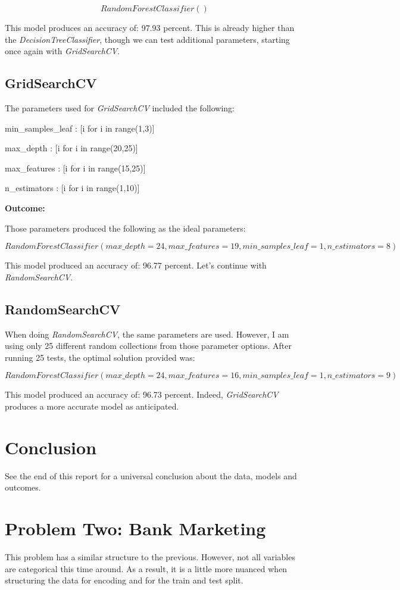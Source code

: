 \documentclass[notitlepage]{report}
\begin{document}
$$
RandomForestClassifier()
$$

This model produces an accuracy of: 97.93 percent. This is already higher than the \textit{DecisionTreeClassifier}, though we can test additional parameters, starting once again with \textit{GridSearchCV}.

\subsection*{GridSearchCV}
The parameters used for \textit{GridSearchCV} included the following:

\qquad min\_samples\_leaf : [i for i in range(1,3)]

\qquad max\_depth : [i for i in range(20,25)]

\qquad max\_features : [i for i in range(15,25)]

\qquad n\_estimators : [i for i in range(1,10)]

\textbf{Outcome:}

Those parameters produced the following as the ideal parameters:

$$
RandomForestClassifier(max\_depth=24,max\_features=19,min\_samples\_leaf=1,n\_estimators=8)
$$

This model produced an accuracy of: 96.77 percent. Let's continue with \textit{RandomSearchCV}.

\subsection*{RandomSearchCV}
When doing \textit{RandomSearchCV}, the same parameters are used. However, I am using only 25 different random collections from those parameter options. After running 25 tests, the optimal solution provided was:

$$
RandomForestClassifier(max\_depth=24,max\_features=16,min\_samples\_leaf=1,n\_estimators=9)
$$

This model produced an accuracy of: 96.73 percent. Indeed, \textit{GridSearchCV} produces a more accurate model as anticipated.

\section*{Conclusion}

See the end of this report for a universal conclusion about the data, models and outcomes.

\section*{Problem Two: Bank Marketing}
This problem has a similar structure to the previous. However, not all variables are categorical this time around. As a result, it is a little more nuanced when structuring the data for encoding and for the train and test split.
\end{document}
